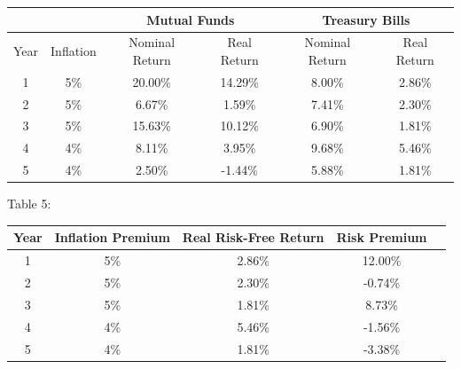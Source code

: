 \documentclass[a4paper]{article}
\begin{document}
\begin{enumerate}
\begin{enumerate}
        \begin{tabular}{|c|c|c|c|c|c|}
            \hline
            \multicolumn{2}{|c|}{} & \multicolumn{2}{|c|}{Mutual Funds} & \multicolumn{2}{c|}{Treasury Bills} \\
            \hline
            Year & Inflation & Nominal Return & Real Return & Nominal Return & Real Return \\
            \hline
            1 & 5\% & 20.00\% & 14.29\% & 8.00\% & 2.86\% \\
            \hline
            2 & 5\% & 6.67\% & 1.59\% & 7.41\% & 2.30\% \\
            \hline
            3 & 5\% & 15.63\% & 10.12\% & 6.90\% & 1.81\% \\
            \hline
            4 & 4\% & 8.11\% & 3.95\% & 9.68\% & 5.46\% \\
            \hline
            5 & 4\% & 2.50\% & -1.44\% & 5.88\% & 1.81\% \\
            \hline
        \end{tabular}

        \vspace{5mm}
        Table 5:

        \begin{tabular}{|c|c|c|c|c|}
            \hline
            Year & Inflation Premium & Real Risk-Free Return & Risk Premium \\
            \hline
            1 & 5\% & 2.86\% & 12.00\% \\
            \hline
            2 & 5\% & 2.30\% & -0.74\% \\
            \hline
            3 & 5\% & 1.81\% & 8.73\% \\
            \hline
            4 & 4\% & 5.46\% & -1.56\% \\
            \hline
            5 & 4\% & 1.81\% & -3.38\% \\
            \hline
        \end{tabular}
    \end{enumerate}

    \vspace{15mm}

\end{enumerate}
\end{document}
